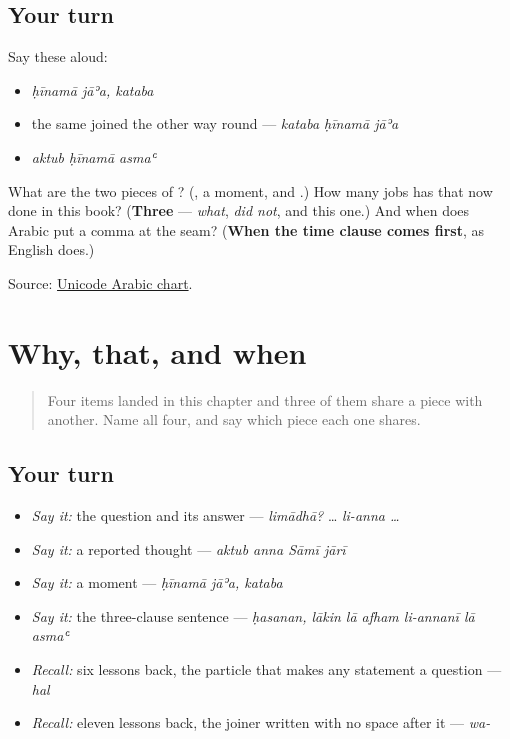 \subsection*{Your turn}
Say these aloud:

\begin{itemize}
\raggedright
  \item \emph{ḥīnamā jāʾa, kataba}
  \item the same joined the other way round — \emph{kataba ḥīnamā jāʾa}
  \item \emph{aktub ḥīnamā asmaʿ}
\end{itemize}

\begin{tcolorbox}[breakable,colback=teal!4,colframe=teal!35!black,title={Before you move on}]
What are the two pieces of \textbf{}? (\textbf{}, a moment, and \textbf{}.) How many jobs has that \textbf{} now done in this book? (\textbf{Three} — \emph{what}, \emph{did not}, and this one.) And when does Arabic put a comma at the seam? (\textbf{When the time clause comes first}, as English does.)

Source: \href{https://www.unicode.org/charts/PDF/U0600.pdf}{Unicode Arabic chart}.
\end{tcolorbox}
\section[\texorpdfstring{\ar{لماذا} · \ar{لأن} · \ar{أنّ} … (limādhā …)}{لماذا · لأن · أنّ … (limādhā …)}]{Why, that, and when}

\label{lesson:AR-R40-why-that-when}



\begin{quote}
Four items landed in this chapter and three of them share a piece with another. Name all four, and say which piece each one shares.
\end{quote}

\subsection*{Your turn}
\begin{itemize}
\raggedright
  \item \emph{Say it:} the question and its answer — \emph{limādhā?} … \emph{li-anna …}
  \item \emph{Say it:} a reported thought — \emph{aktub anna Sāmī jārī}
  \item \emph{Say it:} a moment — \emph{ḥīnamā jāʾa, kataba}
  \item \emph{Say it:} the three-clause sentence — \emph{ḥasanan, lākin lā afham li-annanī lā asmaʿ}
  \item \emph{Recall:} six lessons back, the particle that makes any statement a question — \emph{hal}
  \item \emph{Recall:} eleven lessons back, the joiner written with no space after it — \emph{wa-}
\end{itemize}

